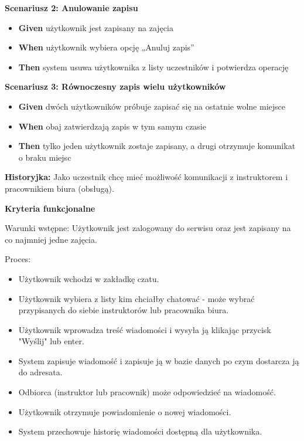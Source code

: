 \documentclass[a4paper,12pt]{article}
\begin{document}
\textbf{Scenariusz 2: Anulowanie zapisu}
\begin{itemize}
    \item \textbf{Given} użytkownik jest zapisany na zajęcia
    \item \textbf{When} użytkownik wybiera opcję „Anuluj zapis”
    \item \textbf{Then} system usuwa użytkownika z listy uczestników i potwierdza operację
\end{itemize}

\textbf{Scenariusz 3: Równoczesny zapis wielu użytkowników}
\begin{itemize}
    \item \textbf{Given} dwóch użytkowników próbuje zapisać się na ostatnie wolne miejsce
    \item \textbf{When} obaj zatwierdzają zapis w tym samym czasie
    \item \textbf{Then} tylko jeden użytkownik zostaje zapisany, a drugi otrzymuje komunikat o braku miejsc
\end{itemize}

\noindent \textbf{Historyjka:} Jako uczestnik chcę mieć możliwość komunikacji z instruktorem i pracownikiem biura (obsługą).

\vspace{0,2cm}

\noindent \textbf{Kryteria funkcjonalne}

\vspace{0,2cm}

\noindent Warunki wstępne: Użytkownik jest zalogowany do serwisu oraz jest zapisany na co najmniej jedne zajęcia.

\vspace{0,2cm}

\noindent Proces:

\begin{itemize}
    \item Użytkownik wchodzi w zakładkę czatu.
    \item Użytkownik wybiera z listy kim chciałby chatować - może wybrać przypisanych do siebie instruktorów lub pracownika biura.
    \item Użytkownik wprowadza treść wiadomości i wysyła ją klikając przycisk "Wyślij" lub enter.
    \item System zapisuje wiadomość i zapisuje ją w bazie danych po czym dostarcza ją do adresata.
    \item Odbiorca (instruktor lub pracownik) może odpowiedzieć na wiadomość.
    \item Użytkownik otrzymuje powiadomienie o nowej wiadomości.
    \item System przechowuje historię wiadomości dostępną dla użytkownika.
\end{itemize}
\end{document}
